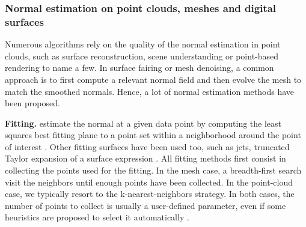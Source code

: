 

\subsubsection{Normal estimation on point clouds, meshes and digital surfaces}
\label{sec:estim:all}

Numerous algorithms rely on the quality of the normal estimation in point clouds, such as
surface reconstruction, scene understanding or point-based rendering to name a few.
In surface fairing or mesh denoising, a common approach is to first compute a relevant
normal field and then evolve the mesh to match the smoothed normals.
Hence, a lot of normal estimation methods have been proposed. 

\noindent\textbf{Fitting.}
\citeauthor*{Hoppe1992} estimate the normal at a given data point by computing
the least squares best fitting plane to a point set within a neighborhood
around the point of interest \cite{Hoppe1992}.
Other fitting surfaces have been used too, such as jets, \ie truncated Taylor expansion
of a surface expression \cite{Cazals2005,Cazals2008}. 
All fitting methods first consist in collecting the points used for the fitting.
In the mesh case, a breadth-first search visit the neighbors until enough points
have been collected. In the point-cloud case, we typically resort to the k-nearest-neighbors
strategy. In both cases, the number of points to collect is usually a user-defined parameter,
even if some heuristics are proposed to select it automatically \cite{Hoppe1992,Cazals2005}.  

